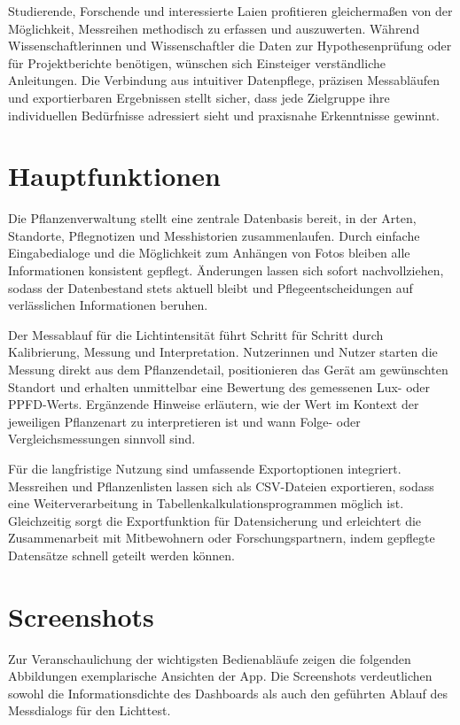 \documentclass[14pt,a4paper]{report}
\begin{document}
Studierende, Forschende und interessierte Laien profitieren gleichermaßen von der Möglichkeit, Messreihen methodisch zu erfassen und auszuwerten. Während Wissenschaftlerinnen und Wissenschaftler die Daten zur Hypothesenprüfung oder für Projektberichte benötigen, wünschen sich Einsteiger verständliche Anleitungen. Die Verbindung aus intuitiver Datenpflege, präzisen Messabläufen und exportierbaren Ergebnissen stellt sicher, dass jede Zielgruppe ihre individuellen Bedürfnisse adressiert sieht und praxisnahe Erkenntnisse gewinnt.

\section{Hauptfunktionen}
Die Pflanzenverwaltung stellt eine zentrale Datenbasis bereit, in der Arten, Standorte, Pflegnotizen und Messhistorien zusammenlaufen. Durch einfache Eingabedialoge und die Möglichkeit zum Anhängen von Fotos bleiben alle Informationen konsistent gepflegt. Änderungen lassen sich sofort nachvollziehen, sodass der Datenbestand stets aktuell bleibt und Pflegeentscheidungen auf verlässlichen Informationen beruhen.

Der Messablauf für die Lichtintensität führt Schritt für Schritt durch Kalibrierung, Messung und Interpretation. Nutzerinnen und Nutzer starten die Messung direkt aus dem Pflanzendetail, positionieren das Gerät am gewünschten Standort und erhalten unmittelbar eine Bewertung des gemessenen Lux- oder PPFD-Werts. Ergänzende Hinweise erläutern, wie der Wert im Kontext der jeweiligen Pflanzenart zu interpretieren ist und wann Folge- oder Vergleichsmessungen sinnvoll sind.

Für die langfristige Nutzung sind umfassende Exportoptionen integriert. Messreihen und Pflanzenlisten lassen sich als CSV-Dateien exportieren, sodass eine Weiterverarbeitung in Tabellenkalkulationsprogrammen möglich ist. Gleichzeitig sorgt die Exportfunktion für Datensicherung und erleichtert die Zusammenarbeit mit Mitbewohnern oder Forschungspartnern, indem gepflegte Datensätze schnell geteilt werden können.

\section{Screenshots}
Zur Veranschaulichung der wichtigsten Bedienabläufe zeigen die folgenden Abbildungen exemplarische Ansichten der App. Die Screenshots verdeutlichen sowohl die Informationsdichte des Dashboards als auch den geführten Ablauf des Messdialogs für den Lichttest.
\end{document}

